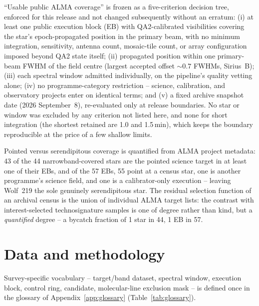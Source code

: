 \documentclass{openjournal}
\begin{document}
``Usable public ALMA coverage'' is frozen as a five-criterion
decision tree, enforced for this release and not changed subsequently
without an erratum: (i) at least one public execution block (EB) with
QA2-calibrated visibilities covering the star's epoch-propagated
position in the primary beam, with no minimum integration,
sensitivity, antenna count, mosaic-tile count, or array configuration
imposed beyond QA2 state itself; (ii) propagated position within one
primary-beam FWHM of the field centre (largest accepted offset
${\sim}0.7$ FWHMs, Sirius~B); (iii) each spectral window admitted
individually, on the pipeline's quality vetting alone; (iv) no
programme-category restriction -- science, calibration, and
observatory projects enter on identical terms; and (v) a fixed
archive snapshot date (2026 September~8), re-evaluated only at
release boundaries. No star or window was excluded by any criterion
not listed here, and none for short integration (the shortest
retained are 1.0 and 1.5\,min), which keeps the boundary reproducible
at the price of a few shallow limits.

Pointed versus serendipitous coverage is quantified from ALMA project
metadata: 43 of the 44 narrowband-covered stars are the pointed
science target in at least one of their EBs, and of the 57 EBs, 55
point at a census star, one is another programme's science field, and
one is a calibrator-only execution -- leaving Wolf~219 the sole
genuinely serendipitous star. The residual selection function of an
archival census is the union of individual ALMA target lists: the
contrast with interest-selected technosignature samples is one of
degree rather than kind, but a \emph{quantified} degree -- a bycatch
fraction of 1 star in 44, 1 EB in 57.



\section{Data and methodology}
\label{sec:method}

Survey-specific vocabulary -- target/band dataset, spectral window,
execution block, control ring, candidate, molecular-line exclusion
mask -- is defined once in the glossary of Appendix~\ref{app:glossary}
(Table~\ref{tab:glossary}).
\end{document}

